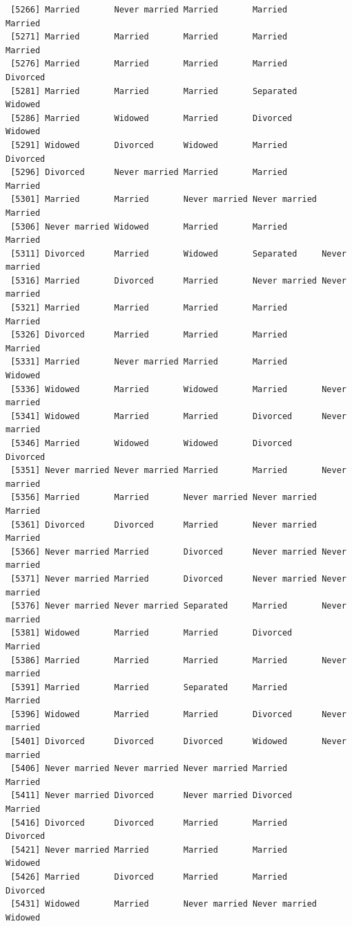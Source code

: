 \documentclass[
  letterpaper,
  DIV=11,
  numbers=noendperiod,
  oneside]{scrartcl}
\begin{document}
\begin{verbatim}
 [5266] Married       Never married Married       Married       Married      
 [5271] Married       Married       Married       Married       Married      
 [5276] Married       Married       Married       Married       Divorced     
 [5281] Married       Married       Married       Separated     Widowed      
 [5286] Married       Widowed       Married       Divorced      Widowed      
 [5291] Widowed       Divorced      Widowed       Married       Divorced     
 [5296] Divorced      Never married Married       Married       Married      
 [5301] Married       Married       Never married Never married Married      
 [5306] Never married Widowed       Married       Married       Married      
 [5311] Divorced      Married       Widowed       Separated     Never married
 [5316] Married       Divorced      Married       Never married Never married
 [5321] Married       Married       Married       Married       Married      
 [5326] Divorced      Married       Married       Married       Married      
 [5331] Married       Never married Married       Married       Widowed      
 [5336] Widowed       Married       Widowed       Married       Never married
 [5341] Widowed       Married       Married       Divorced      Never married
 [5346] Married       Widowed       Widowed       Divorced      Divorced     
 [5351] Never married Never married Married       Married       Never married
 [5356] Married       Married       Never married Never married Married      
 [5361] Divorced      Divorced      Married       Never married Married      
 [5366] Never married Married       Divorced      Never married Never married
 [5371] Never married Married       Divorced      Never married Never married
 [5376] Never married Never married Separated     Married       Never married
 [5381] Widowed       Married       Married       Divorced      Married      
 [5386] Married       Married       Married       Married       Never married
 [5391] Married       Married       Separated     Married       Married      
 [5396] Widowed       Married       Married       Divorced      Never married
 [5401] Divorced      Divorced      Divorced      Widowed       Never married
 [5406] Never married Never married Never married Married       Married      
 [5411] Never married Divorced      Never married Divorced      Married      
 [5416] Divorced      Divorced      Married       Married       Divorced     
 [5421] Never married Married       Married       Married       Widowed      
 [5426] Married       Divorced      Married       Married       Divorced     
 [5431] Widowed       Married       Never married Never married Widowed      

\end{verbatim}
\end{document}
